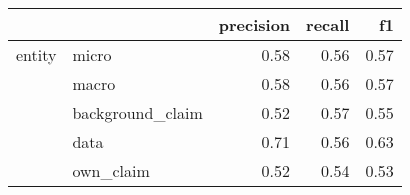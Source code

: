 \begin{tabular}{llrrr}
\toprule
       &           &  precision &  recall &   f1 \\
\midrule
entity & micro &       0.58 &    0.56 & 0.57 \\
       & macro &       0.58 &    0.56 & 0.57 \\
       & background\_claim &       0.52 &    0.57 & 0.55 \\
       & data &       0.71 &    0.56 & 0.63 \\
       & own\_claim &       0.52 &    0.54 & 0.53 \\
\bottomrule
\end{tabular}
